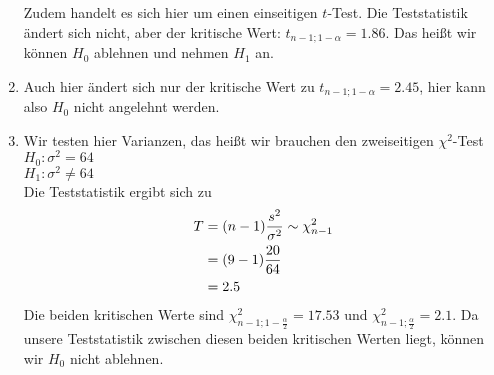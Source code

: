 \documentclass{article}
\begin{document}
\begin{enumerate}[label=(\alph*)]
		Zudem handelt es sich hier um einen einseitigen $t$-Test. Die Teststatistik ändert sich nicht, aber der kritische Wert: $t_{n-1;1-\alpha}=1.86$. Das heißt wir können $H_0$ ablehnen und nehmen $H_1$ an.
		\item Auch hier ändert sich nur der kritische Wert zu $t_{n-1;1-\alpha}=2.45$, hier kann also $H_0$ nicht angelehnt werden.
		\item Wir testen hier Varianzen, das heißt wir brauchen den zweiseitigen $\chi^2$-Test \\
		$H_0: \sigma^2 = 64$ \\
		$H_1: \sigma^2 \neq 64$ \\
		Die Teststatistik ergibt sich zu
		\begin{align}
			T &= (n-1)\frac{s^2}{\sigma^2} \sim \chi^2_{n-1} \notag \\
			&= (9-1)\frac{20}{64} \notag \\
			&= 2.5 \notag
		\end{align}
		Die beiden kritischen Werte sind $\chi^2_{n-1;1-\frac{\alpha}{2}}=17.53$ und  $\chi^2_{n-1;\frac{\alpha}{2}}=2.1$. Da unsere Teststatistik zwischen diesen beiden kritischen Werten liegt, können wir $H_0$ nicht ablehnen.
	\end{enumerate}
	
\end{document}
